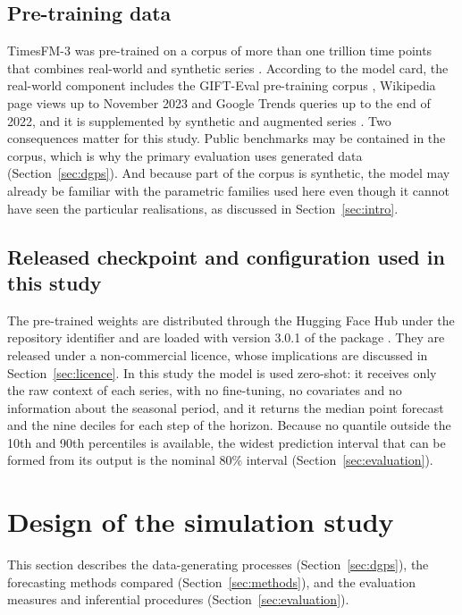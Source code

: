 \documentclass[article]{ajs}
\providecommand{\sectionref}[1]{Section~\ref{#1}}
\begin{document}
\subsection{Pre-training data}
\label{sec:tfm-data}

TimesFM-3 was pre-trained on a corpus of more than one trillion time points that combines
real-world and synthetic series \citep{timesfm3blog}. According to the model card, the
real-world component includes the GIFT-Eval pre-training corpus \citep{aksu2024gifteval},
Wikipedia page views up to November 2023 and Google Trends queries up to the end of 2022, and it
is supplemented by synthetic and augmented series \citep{timesfm3card}. Two consequences matter
for this study. Public benchmarks may be contained in the corpus, which is why the primary
evaluation uses generated data (\sectionref{sec:dgps}). And because part of the corpus is
synthetic, the model may already be familiar with the parametric families used here even though
it cannot have seen the particular realisations, as discussed in \sectionref{sec:intro}.

\subsection{Released checkpoint and configuration used in this study}
\label{sec:tfm-config}

The pre-trained weights are distributed through the Hugging Face Hub under the repository
identifier  and are loaded with version 3.0.1 of the
  package \citep{timesfm3repo, timesfm3card}. They are released
under a non-commercial licence, whose implications are discussed in \sectionref{sec:licence}. In
this study the model is used zero-shot: it receives only the raw context of each series, with no
fine-tuning, no covariates and no information about the seasonal period, and it returns the
median point forecast and the nine deciles for each step of the horizon. Because no quantile
outside the 10th and 90th percentiles is available, the widest prediction interval that can be
formed from its output is the nominal 80\% interval (\sectionref{sec:evaluation}).

\section{Design of the simulation study}
\label{sec:design}

This section describes the data-generating processes (\sectionref{sec:dgps}), the forecasting
methods compared (\sectionref{sec:methods}), and the evaluation measures and inferential
procedures (\sectionref{sec:evaluation}).
\end{document}
